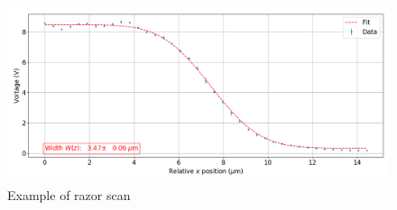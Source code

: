 \begin{figure}
\centering
\includegraphics[width=1\textwidth]{img/razorscan}
\caption{Example of razor scan}
\label{examplerazorscan}
\end{figure}


